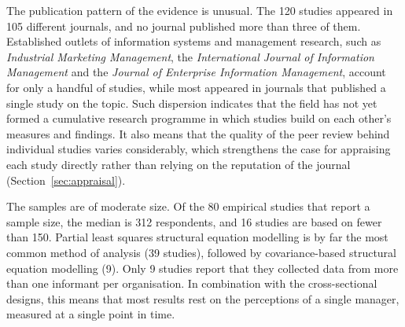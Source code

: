 The publication pattern of the evidence is unusual. The 120 studies appeared in 105 different journals, and no journal published more than three of them. Established outlets of information systems and management research, such as \textit{Industrial Marketing Management}, the \textit{International Journal of Information Management} and the \textit{Journal of Enterprise Information Management}, account for only a handful of studies, while most appeared in journals that published a single study on the topic. Such dispersion indicates that the field has not yet formed a cumulative research programme in which studies build on each other's measures and findings. It also means that the quality of the peer review behind individual studies varies considerably, which strengthens the case for appraising each study directly rather than relying on the reputation of the journal (Section~\ref{sec:appraisal}).

The samples are of moderate size. Of the 80 empirical studies that report a sample size, the median is 312 respondents, and 16 studies are based on fewer than 150. Partial least squares structural equation modelling is by far the most common method of analysis (39 studies), followed by covariance-based structural equation modelling (9). Only 9 studies report that they collected data from more than one informant per organisation. In combination with the cross-sectional designs, this means that most results rest on the perceptions of a single manager, measured at a single point in time.

